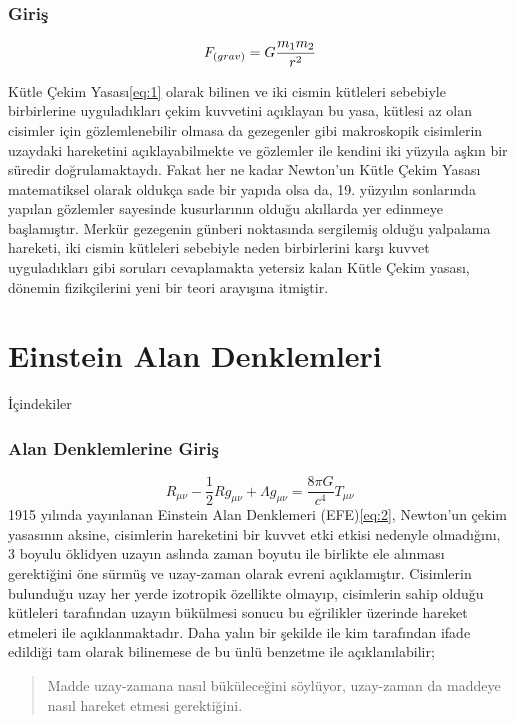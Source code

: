 \documentclass[aspectratio=169]{beamer}
\begin{document}
    \begin{frame}
    \frametitle{Giriş}
        
        \begin{equation}
        \label{eq:1}
        F_{\text(grav)} = G \frac{m_1 m_2}{r^2}
        \end{equation}
        
        Kütle Çekim Yasası\ref{eq:1} olarak bilinen ve iki cismin kütleleri sebebiyle birbirlerine uyguladıkları çekim kuvvetini açıklayan bu yasa, kütlesi az olan cisimler için gözlemlenebilir olmasa da gezegenler gibi makroskopik cisimlerin uzaydaki hareketini açıklayabilmekte ve gözlemler ile kendini iki yüzyıla aşkın bir süredir doğrulamaktaydı. Fakat her ne kadar Newton'un Kütle Çekim Yasası matematiksel olarak oldukça sade bir yapıda olsa da, 19. yüzyılın sonlarında yapılan gözlemler sayesinde kusurlarının olduğu akıllarda yer edinmeye başlamıştır. Merkür gezegenin günberi noktasında sergilemiş olduğu yalpalama hareketi, iki cismin kütleleri sebebiyle neden birbirlerini karşı kuvvet uyguladıkları gibi soruları cevaplamakta yetersiz kalan Kütle Çekim yasası, dönemin fizikçilerini yeni bir teori arayışına itmiştir.
    \end{frame}

\section{Einstein Alan Denklemleri}
    \begin{frame}{İçindekiler}      
        \tableofcontents[currentsection]

    \end{frame}
    \begin{frame}
        \frametitle{Alan Denklemlerine Giriş}
        \begin{equation}
            \label{eq:2}
            R_{\mu\nu} - \frac{1}{2}Rg_{\mu\nu} + \Lambda g_{\mu\nu} = \frac{8\pi G}{c^4}T_{\mu\nu}
        \end{equation}
        1915 yılında yayınlanan Einstein Alan Denklemeri (EFE)\ref{eq:2}, Newton'un çekim yasasının aksine, cisimlerin hareketini bir kuvvet etki etkisi nedenyle olmadığını, 3 boyulu öklidyen uzayın aslında zaman boyutu ile birlikte ele alınması gerektiğini öne sürmüş ve uzay-zaman olarak evreni açıklamıştır. Cisimlerin bulunduğu uzay her yerde izotropik özellikte olmayıp, cisimlerin sahip olduğu kütleleri tarafından uzayın bükülmesi sonucu bu eğrilikler üzerinde hareket etmeleri ile açıklanmaktadır.\cite{Hartle2021} Daha yalın bir şekilde ile kim tarafından ifade edildiği tam olarak bilinemese de bu ünlü benzetme ile açıklanılabilir;
        \begin{quote}
            Madde uzay-zamana nasıl büküleceğini söylüyor, uzay-zaman da maddeye nasıl hareket etmesi gerektiğini.
        \end{quote}
        
    \end{frame}
\end{document}

